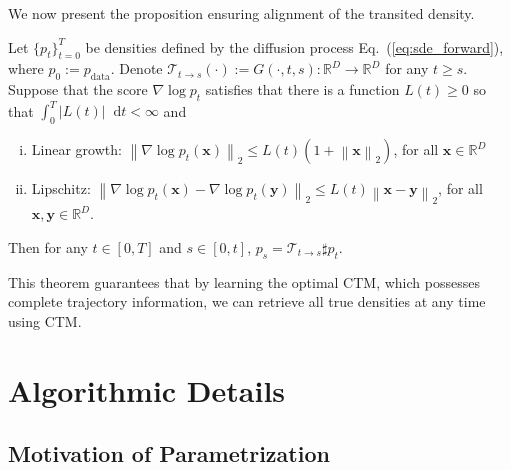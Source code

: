 \documentclass{article} \usepackage{iclr2024_coNFErence,times}
\def\eqref#1{equation~\ref{#1}}
\newcommand{\norm}[1]{\left\lVert#1\right\rVert}
\newcommand{\abs}[1]{\left|#1\right|}
\def\eqref#1{(\ref{#1})}
\def\eqref#1{(\ref{#1})}
\theoremstyle{definition}
\theoremstyle{remark}
\newcommand*\diff{\mathop{}\!\mathrm{d}}
\begin{document}
We now present the proposition ensuring alignment of the transited density.
\begin{proposition}\label{th:transition}
    Let $\{p_t\}_{t=0}^{T}$ be densities defined by the diffusion process Eq.~\eqref{eq:sde_forward}, where $p_0:=p_{\text{data}}$. Denote $\mathcal{T}_{t\rightarrow s}(\cdot):=G(\cdot, t, s)\colon\mathbb{R}^D\rightarrow\mathbb{R}^D$ for any $ t\geq s$.  Suppose that the score $\nabla\log p_t$ satisfies that there is a function $L(t)\geq 0$ so that $\int_{0}^{T}\abs{L(t)}\diff t <\infty$ and 
    \begin{enumerate}[(i)]
        \item Linear growth: $\norm{\nabla\log p_t(\mathbf{x})}_2\leq L(t) (1+\norm{\mathbf{x}}_2)$, for all $\mathbf{x}\in\mathbb{R}^D$
        \item Lipschitz: $\norm{\nabla\log p_t(\mathbf{x})- \nabla\log p_t(\mathbf{y})}_2\leq L(t) \norm{\mathbf{x}-\mathbf{y}}_2$, for all $\mathbf{x},\mathbf{y}\in\mathbb{R}^D$.
    \end{enumerate}
    Then for any $t\in[0,T]$ and $s\in[0,t]$, $p_s =\mathcal{T}_{t\rightarrow s} \sharp p_t$.
\end{proposition}

This theorem guarantees that by learning the optimal CTM, which possesses complete trajectory information, we can retrieve all true densities at any time using CTM.








\section{Algorithmic Details}

\subsection{Motivation of Parametrization}\label{sec:parametrization}
\end{document}
